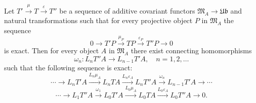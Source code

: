 \begin{theorem}
Let $T' \xrightarrow{\mu} T \xrightarrow{\varepsilon} T''$ be a sequence of additive covariant functors $\mathfrak{M}_A \rightarrow \mathfrak{Ub}$ and natural transformations such that for every projective object $P$ in $\mathfrak{M}_A$ the sequence
\[
0 \rightarrow T' P \xrightarrow{\mu_P} T P \xrightarrow{\varepsilon_P} T'' P \rightarrow 0
\]
is exact. Then for every object $A$ in $\mathfrak{M}_A$ there exist connecting homomorphisms
\[
\omega_n: L_n T'' A \rightarrow L_{n-1} T' A, \quad n = 1, 2, \ldots
\]
such that the following sequence is exact:
\[
\cdots \rightarrow L_n T' A \xrightarrow{L_n \mu_A} L_n T A \xrightarrow{L_n \varepsilon_A} L_n T'' A \xrightarrow{\omega_n} L_{n-1} T' A \rightarrow \cdots
\]
\[
\cdots \rightarrow L_1 T'' A \xrightarrow{\omega_1} L_0 T' A \xrightarrow{L_0 \mu_A} L_0 T A \xrightarrow{L_0 \varepsilon_A} L_0 T'' A \rightarrow 0.
\]
\end{theorem}
